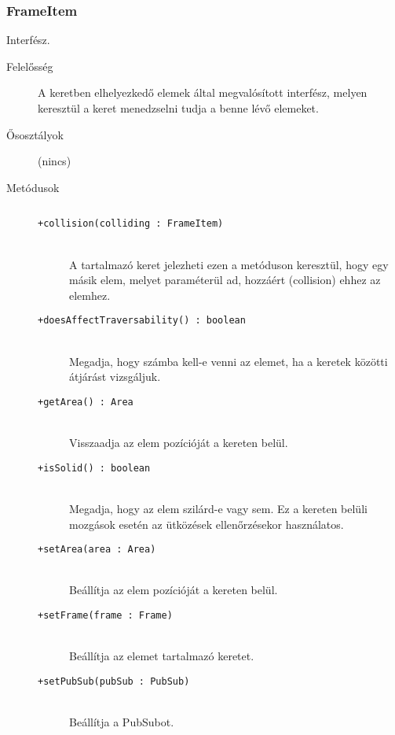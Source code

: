 		\subsubsection{FrameItem} Interfész.
			\begin{description}

				\item[Felelősség] A keretben elhelyezkedő elemek által megvalósított interfész, melyen keresztül a keret menedzselni tudja a benne lévő elemeket.

				\item[Ősosztályok] (nincs)
				\item[Metódusok]$\ $
					\begin{description}
						\item[\texttt{+collision(colliding : FrameItem)}] \hfill \\A tartalmazó keret jelezheti ezen a metóduson keresztül,  hogy egy másik elem, melyet paraméterül ad,  hozzáért (collision) ehhez az elemhez. 
						\item[\texttt{+doesAffectTraversability() : boolean}] \hfill \\Megadja, hogy számba kell-e venni az elemet,  ha a keretek közötti átjárást vizsgáljuk. 
						\item[\texttt{+getArea() : Area}] \hfill \\Visszaadja az elem pozícióját a kereten belül. 
						\item[\texttt{+isSolid() : boolean}] \hfill \\Megadja, hogy az elem szilárd-e vagy sem.  Ez a kereten belüli mozgások esetén az  ütközések ellenőrzésekor használatos. 
						\item[\texttt{+setArea(area : Area)}] \hfill \\Beállítja az elem pozícióját a kereten belül. 
						\item[\texttt{+setFrame(frame : Frame)}] \hfill \\Beállítja az elemet tartalmazó keretet. 
						\item[\texttt{+setPubSub(pubSub : PubSub)}] \hfill \\Beállítja a PubSubot.
					\end{description}
			\end{description}

